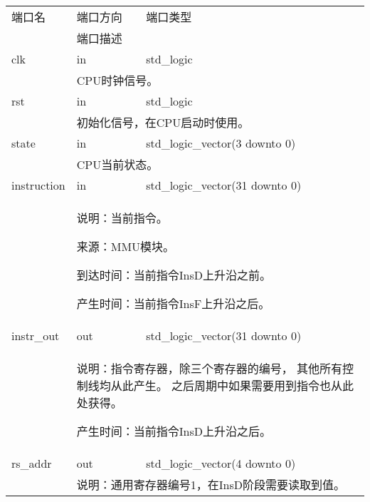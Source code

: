         \begin{tabularx}{\textwidth}{lll}
            \toprule
            端口名          & 端口方向  & 端口类型 \\
            \cmidrule(l){2-3}
            &
            \multicolumn{2}{X}{端口描述} \\
            \midrule
            clk             & in        & std\_logic \\
            \cmidrule(l){2-3}
            &
            \multicolumn{2}{X}{
                CPU时钟信号。
            } \\
            \midrule
            rst             & in        & std\_logic \\
            \cmidrule(l){2-3}
            &
            \multicolumn{2}{X}{
                初始化信号，在CPU启动时使用。
            } \\
            \midrule
            state           & in        & std\_logic\_vector(3 downto 0) \\
            \cmidrule(l){2-3}
            &
            \multicolumn{2}{X}{
                CPU当前状态。
            } \\
            \midrule
            instruction     & in        & std\_logic\_vector(31 downto 0) \\
            \cmidrule(l){2-3}
            &
            \multicolumn{2}{X}{
                说明：当前指令。

                来源：MMU模块。

                到达时间：当前指令InsD上升沿之前。

                产生时间：当前指令InsF上升沿之后。
            } \\
            \midrule
            instr\_out      & out       & std\_logic\_vector(31 downto 0) \\
            \cmidrule(l){2-3}
            &
            \multicolumn{2}{X}{
                说明：指令寄存器，除三个寄存器的编号，%
                其他所有控制线均从此产生。%
                之后周期中如果需要用到指令也从此处获得。

                产生时间：当前指令InsD上升沿之后。
            } \\
            \midrule
            rs\_addr        & out       & std\_logic\_vector(4 downto 0) \\
            \cmidrule(l){2-3}
            &
            \multicolumn{2}{X}{
                说明：通用寄存器编号1，在InsD阶段需要读取到值。

}
\end{tabularx}
